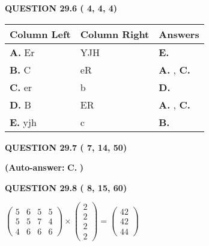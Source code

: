 \documentclass[12pt]{article}
\begin{document}
{\textbf{\large{QUESTION
29.6 
 (          4,          4,          4)
}}}
 
 
\noindent{}
  
  
\begin{tabular}{|l|l|l|}
 \hline
 Column Left & Column Right  & Answers       \\ 
 \hline
{\textbf{\large{
A.}}}
Er
  & 
YJH
 & 
{\textbf{\large{
E.}}}
 \\ 
 \hline
{\textbf{\large{
B.}}}
C
  & 
eR
 & 
{\textbf{\large{
A.}}}
, 
{\textbf{\large{
C.}}}
 \\ 
 \hline
{\textbf{\large{
C.}}}
er
  & 
b
 & 
{\textbf{\large{
D.}}}
 \\ 
 \hline
{\textbf{\large{
D.}}}
B
  & 
ER
 & 
{\textbf{\large{
A.}}}
, 
{\textbf{\large{
C.}}}
 \\ 
 \hline
{\textbf{\large{
E.}}}
yjh
  & 
c
 & 
{\textbf{\large{
B.}}}
 \\ 
 \hline
 \end{tabular}
  
  
\noindent{}
 
 
  
  
{\textbf{\large{QUESTION
29.7 
 (          7,         14,         50)
}}}
 
 
{\textbf{(Auto-answer:}}
{\textbf{\large{
C.}}}
{\textbf{)}}
 
 
  
  
{\textbf{\large{QUESTION
29.8 
 (          8,         15,         60)
}}}

 
$\left( \begin{array}{ccccccccccccccc}
           5 & 
           6 & 
           5 & 
           5 \\ 
           5 & 
           5 & 
           7 & 
           4 \\ 
           4 & 
           6 & 
           6 & 
           6
\end{array}\right) \times
\left( \begin{array}{c}
           2 \\ 
           2 \\ 
           2 \\ 
           2
\end{array}\right)  =
\left( \begin{array}{c}
          42 \\ 
          42 \\ 
          44
\end{array}\right)  $
 
\end{document}
